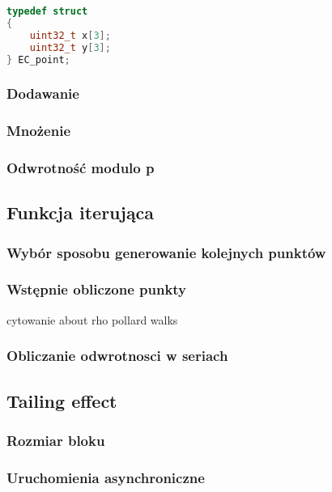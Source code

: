 \begin{lstlisting}[language=C++]
typedef struct
{
    uint32_t x[3];
    uint32_t y[3];
} EC_point;
\end{lstlisting}

\subsubsection{Dodawanie}

\subsubsection{Mnożenie}

\subsubsection{Odwrotność modulo p}

\subsection*{Funkcja iterująca}

\subsubsection{Wybór sposobu generowanie kolejnych punktów}

\subsubsection{Wstępnie obliczone punkty}
cytowanie about rho pollard walks


\subsubsection{Obliczanie odwrotnosci w seriach}

\subsection{Tailing effect}
\subsubsection{Rozmiar bloku}
\subsubsection{Uruchomienia asynchroniczne}

